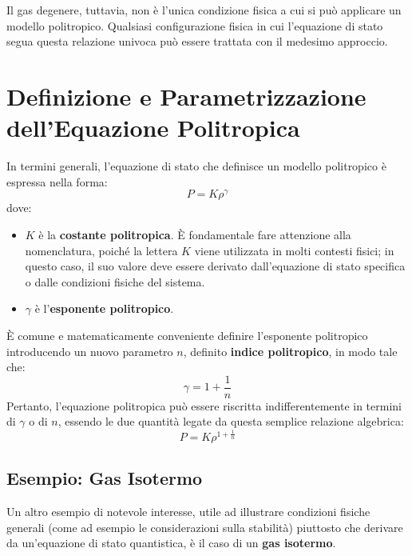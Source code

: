 Il gas degenere, tuttavia, non è l'unica condizione fisica a cui si può applicare un modello politropico. Qualsiasi configurazione fisica in cui l'equazione di stato segua questa relazione univoca può essere trattata con il medesimo approccio.

\section{Definizione e Parametrizzazione dell'Equazione Politropica}

In termini generali, l'equazione di stato che definisce un modello politropico è espressa nella forma:
\begin{equation}
P = K \rho^{\gamma}
\end{equation}
dove:
\begin{itemize}
\item $K$ è la \textbf{costante politropica}. È fondamentale fare attenzione alla nomenclatura, poiché la lettera $K$ viene utilizzata in molti contesti fisici; in questo caso, il suo valore deve essere derivato dall'equazione di stato specifica o dalle condizioni fisiche del sistema.
\item $\gamma$ è l'\textbf{esponente politropico}.
\end{itemize}

È comune e matematicamente conveniente definire l'esponente politropico introducendo un nuovo parametro $n$, definito \textbf{indice politropico}, in modo tale che:
\begin{equation}
\gamma = 1 + \frac{1}{n}
\end{equation}
Pertanto, l'equazione politropica può essere riscritta indifferentemente in termini di $\gamma$ o di $n$, essendo le due quantità legate da questa semplice relazione algebrica:
\begin{equation}
P = K \rho^{1 + \frac{1}{n}}
\end{equation}

\subsection{Esempio: Gas Isotermo}

Un altro esempio di notevole interesse, utile ad illustrare condizioni fisiche generali (come ad esempio le considerazioni sulla stabilità) piuttosto che derivare da un'equazione di stato quantistica, è il caso di un \textbf{gas isotermo}.

